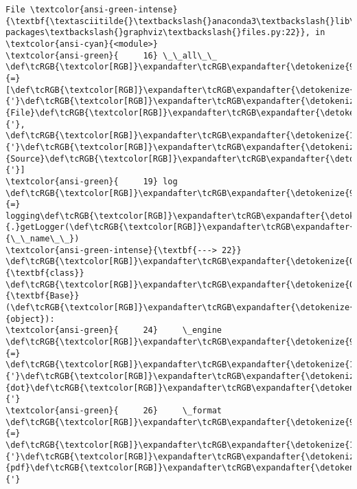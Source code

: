 \documentclass[11pt]{article}
\begin{document}
\begin{Verbatim}[commandchars=\\\{\}, frame=single, framerule=2mm, rulecolor=\color{outerrorbackground}]
File \textcolor{ansi-green-intense}{\textbf{\textasciitilde{}\textbackslash{}anaconda3\textbackslash{}lib\textbackslash{}site-packages\textbackslash{}graphviz\textbackslash{}files.py:22}}, in \textcolor{ansi-cyan}{<module>}
\textcolor{ansi-green}{     16} \_\_all\_\_ \def\tcRGB{\textcolor[RGB]}\expandafter\tcRGB\expandafter{\detokenize{98,98,98}}{=} [\def\tcRGB{\textcolor[RGB]}\expandafter\tcRGB\expandafter{\detokenize{175,0,0}}{'}\def\tcRGB{\textcolor[RGB]}\expandafter\tcRGB\expandafter{\detokenize{175,0,0}}{File}\def\tcRGB{\textcolor[RGB]}\expandafter\tcRGB\expandafter{\detokenize{175,0,0}}{'}, \def\tcRGB{\textcolor[RGB]}\expandafter\tcRGB\expandafter{\detokenize{175,0,0}}{'}\def\tcRGB{\textcolor[RGB]}\expandafter\tcRGB\expandafter{\detokenize{175,0,0}}{Source}\def\tcRGB{\textcolor[RGB]}\expandafter\tcRGB\expandafter{\detokenize{175,0,0}}{'}]
\textcolor{ansi-green}{     19} log \def\tcRGB{\textcolor[RGB]}\expandafter\tcRGB\expandafter{\detokenize{98,98,98}}{=} logging\def\tcRGB{\textcolor[RGB]}\expandafter\tcRGB\expandafter{\detokenize{98,98,98}}{.}getLogger(\def\tcRGB{\textcolor[RGB]}\expandafter\tcRGB\expandafter{\detokenize{0,0,135}}{\_\_name\_\_})
\textcolor{ansi-green-intense}{\textbf{---> 22}} \def\tcRGB{\textcolor[RGB]}\expandafter\tcRGB\expandafter{\detokenize{0,135,0}}{\textbf{class}} \def\tcRGB{\textcolor[RGB]}\expandafter\tcRGB\expandafter{\detokenize{0,0,255}}{\textbf{Base}}(\def\tcRGB{\textcolor[RGB]}\expandafter\tcRGB\expandafter{\detokenize{0,135,0}}{object}):
\textcolor{ansi-green}{     24}     \_engine \def\tcRGB{\textcolor[RGB]}\expandafter\tcRGB\expandafter{\detokenize{98,98,98}}{=} \def\tcRGB{\textcolor[RGB]}\expandafter\tcRGB\expandafter{\detokenize{175,0,0}}{'}\def\tcRGB{\textcolor[RGB]}\expandafter\tcRGB\expandafter{\detokenize{175,0,0}}{dot}\def\tcRGB{\textcolor[RGB]}\expandafter\tcRGB\expandafter{\detokenize{175,0,0}}{'}
\textcolor{ansi-green}{     26}     \_format \def\tcRGB{\textcolor[RGB]}\expandafter\tcRGB\expandafter{\detokenize{98,98,98}}{=} \def\tcRGB{\textcolor[RGB]}\expandafter\tcRGB\expandafter{\detokenize{175,0,0}}{'}\def\tcRGB{\textcolor[RGB]}\expandafter\tcRGB\expandafter{\detokenize{175,0,0}}{pdf}\def\tcRGB{\textcolor[RGB]}\expandafter\tcRGB\expandafter{\detokenize{175,0,0}}{'}


\end{Verbatim}
\end{document}
